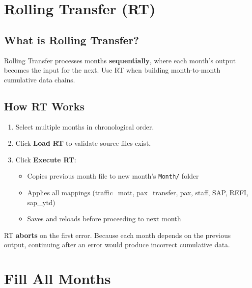 \documentclass[11pt,a4paper]{article}
\begin{document}
\section{Rolling Transfer (RT)}

\subsection{What is Rolling Transfer?}

Rolling Transfer processes months \textbf{sequentially}, where each month's output becomes the input for the next. Use RT when building month-to-month cumulative data chains.

\subsection{How RT Works}

\begin{enumerate}[leftmargin=*, itemsep=6pt]
\item Select multiple months in chronological order.
\item Click \textbf{Load RT} to validate source files exist.
\item Click \textbf{Execute RT}:
    \begin{itemize}[leftmargin=*, itemsep=2pt]
    \item Copies previous month file to new month's \texttt{Month/} folder
    \item Applies all mappings (traffic\_mott, pax\_transfer, pax, staff, SAP, REFI, sap\_ytd)
    \item Saves and reloads before proceeding to next month
    \end{itemize}
\end{enumerate}

\begin{warningbox}
RT \textbf{aborts} on the first error. Because each month depends on the previous output, continuing after an error would produce incorrect cumulative data.
\end{warningbox}

\section{Fill All Months}
\end{document}

